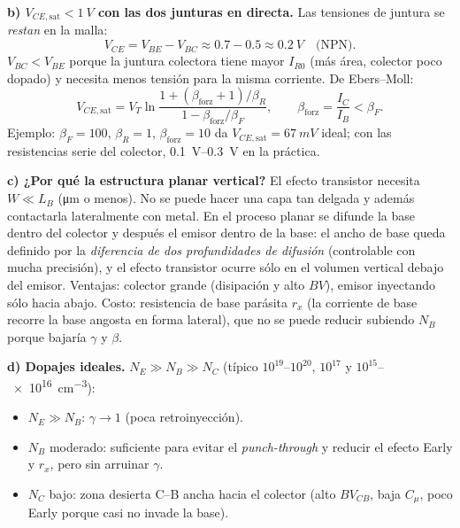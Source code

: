 \documentclass[11pt,a4paper]{article}
\begin{document}
\textbf{b) $V_{CE,\text{sat}}<\SI{1}{V}$ con las dos junturas en directa.} Las tensiones
de juntura se \emph{restan} en la malla:
\[
  V_{CE}=V_{BE}-V_{BC}\approx0.7-0.5\approx\SI{0.2}{V}\quad\text{(NPN)}.
\]
$V_{BC}<V_{BE}$ porque la juntura colectora tiene mayor $I_{R0}$ (más área, colector poco dopado)
y necesita menos tensión para la misma corriente. De Ebers--Moll:
\[
  V_{CE,\text{sat}}=V_T\ln\frac{1+(\beta_{\text{forz}}+1)/\beta_R}{1-\beta_{\text{forz}}/\beta_F},
  \qquad\beta_{\text{forz}}=\frac{I_C}{I_B}<\beta_F .
\]
Ejemplo: $\beta_F=100$, $\beta_R=1$, $\beta_{\text{forz}}=10$ da $V_{CE,\text{sat}}=\SI{67}{mV}$
ideal; con las resistencias serie del colector, \SIrange{0.1}{0.3}{V} en la práctica.

\textbf{c) ¿Por qué la estructura planar vertical?} El efecto transistor necesita
$W\ll L_B$ (\si{\micro m} o menos). No se puede hacer una capa tan delgada y además contactarla
lateralmente con metal. En el proceso planar se difunde la base dentro del colector y después el
emisor dentro de la base: el ancho de base queda definido por la \emph{diferencia de dos
profundidades de difusión} (controlable con mucha precisión), y el efecto transistor ocurre sólo
en el volumen vertical debajo del emisor. Ventajas: colector grande (disipación y alto $BV$),
emisor inyectando sólo hacia abajo. Costo: resistencia de base parásita $r_x$ (la corriente de base
recorre la base angosta en forma lateral), que no se puede reducir subiendo $N_B$ porque bajaría
$\gamma$ y $\beta$.

\textbf{d) Dopajes ideales.} $N_E\gg N_B\gg N_C$ (típico $10^{19}$--$10^{20}$, $10^{17}$ y $10^{15}$--\SI{e16}{cm^{-3}}):
\begin{itemize}
  \item $N_E\gg N_B$: $\gamma\to1$ (poca retroinyección).
  \item $N_B$ moderado: suficiente para evitar el \emph{punch-through} y reducir el efecto Early y
  $r_x$, pero sin arruinar $\gamma$.
  \item $N_C$ bajo: zona desierta C--B ancha hacia el colector (alto $BV_{CB}$, baja $C_\mu$, poco
  Early porque casi no invade la base).
\end{itemize}
\end{document}
